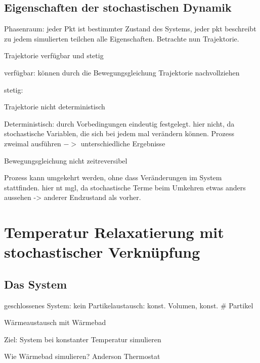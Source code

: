 \documentclass[twocolumn]{article}
\let\tempone\itemize
\let\temptwo\enditemize
\renewenvironment{itemize}{\tempone\addtolength{\itemsep}{-.5\baselineskip}}{\temptwo}
\begin{document}
\subsection{Eigenschaften der stochastischen Dynamik}
\begin{itemize}
	\item Phasenraum: jeder Pkt ist bestimmter Zustand des Systems, jeder pkt beschreibt zu jedem simulierten teilchen alle Eigenschaften. Betrachte nun Trajektorie. 
	\item Trajektorie verfügbar und stetig 
	\begin{itemize}
		\item verfügbar: können durch die Bewegungsgleichung Trajektorie nachvollziehen
		\item stetig: %
	\end{itemize}
	\item Trajektorie nicht deterministisch 
	\begin{itemize}
		\item Deterministisch: durch Vorbedingungen eindeutig festgelegt. hier nicht, da stochastische Variablen, die sich bei jedem mal verändern können. Prozess zweimal ausführen $->$ unterschiedliche Ergebnisse
	\end{itemize}
	\item Bewegungsgleichung nicht zeitreversibel 
	\begin{itemize}
		\item Prozess kann umgekehrt werden, ohne dass Veränderungen im System stattfinden. hier nt mgl, da stochastische Terme beim Umkehren etwas anders aussehen -> anderer Endzustand als vorher. 
	\end{itemize}	
\end{itemize}



\section{Temperatur Relaxatierung mit stochastischer Verknüpfung}

\subsection{Das System}
	\begin{itemize}
		\item geschlossenes System: kein Partikelaustausch:  konst. Volumen, konst. \# Partikel
		\item Wärmeaustausch mit Wärmebad
		\item Ziel: System bei konstanter Temperatur simulieren
		\item Wie Wärmebad simulieren? Anderson Thermostat
	\end{itemize}
\end{document}
